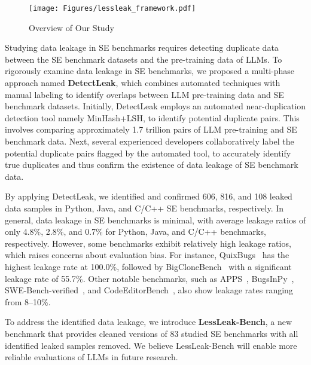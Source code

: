 \begin{figure*}[t] 
    \centering
    \texttt{[image: Figures/lessleak\_framework.pdf]} 
    \vspace{-0.5cm}
    \caption{Overview of Our Study} 
    \vspace{-0.3cm}
    \label{fig:framework}
\end{figure*}

Studying data leakage in SE benchmarks requires detecting duplicate data between the SE benchmark datasets and the pre-training data of LLMs. To rigorously examine data leakage in SE benchmarks, we proposed a multi-phase approach named \textbf{DetectLeak}, which combines automated techniques with manual labeling to identify overlaps between LLM pre-training data and SE benchmark datasets.
Initially, DetectLeak employs an automated near-duplication detection tool namely MinHash+LSH, to identify potential duplicate pairs. This involves comparing approximately 1.7 trillion pairs of LLM pre-training and SE benchmark data.
Next, several experienced developers collaboratively label the potential duplicate pairs flagged by the automated tool, to accurately identify true duplicates and thus confirm the existence of data leakage of SE benchmark data. 



By applying DetectLeak, we identified and confirmed 606, 816, and 108 leaked data samples in Python, Java, and C/C++ SE benchmarks, respectively.
In general, data leakage in SE benchmarks is minimal, with average leakage ratios of only 4.8\%, 2.8\%, and 0.7\% for Python, Java, and C/C++ benchmarks, respectively. However, some benchmarks exhibit relatively high leakage ratios, which raises concerns about evaluation bias. For instance, QuixBugs~\cite{QuixBugs} has the highest leakage rate at 100.0\%, followed by BigCloneBench~\cite{BigCloneBench} with a significant leakage rate of 55.7\%. Other notable benchmarks, such as APPS~\cite{hendrycks2021measuring}, BugsInPy~\cite{BugsInPy}, SWE-Bench-verified~\cite{SWE-bench-verified}, and CodeEditorBench~\cite{CodeEditorBench}, also show leakage rates ranging from 8–10\%.

To address the identified data leakage, we introduce \textbf{LessLeak-Bench}, a new benchmark that provides cleaned versions of 83 studied SE benchmarks with all identified leaked samples removed. We believe LessLeak-Bench will enable more reliable evaluations of LLMs in future research.



